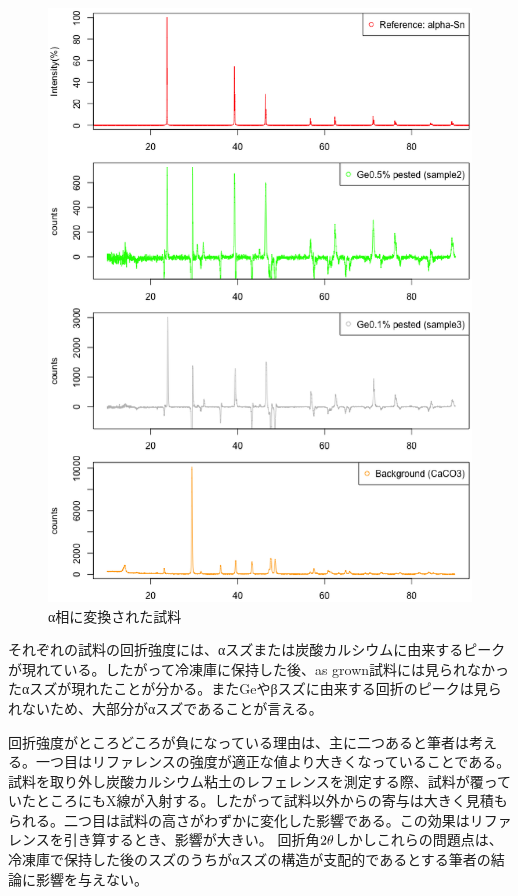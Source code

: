 \begin{figure}[!h]
  \begin{center}
  \includegraphics[width=0.8\hsize]{results_discussions/intensity_pested_samples.eps}
  \end{center}
  \caption{α相に変換された試料}
  \label{fig:intensity_pested_samples}
\end{figure}

それぞれの試料の回折強度には、αスズまたは炭酸カルシウムに由来するピークが現れている。したがって冷凍庫に保持した後、as grown試料には見られなかったαスズが現れたことが分かる。またGeやβスズに由来する回折のピークは見られないため、大部分がαスズであることが言える。

回折強度がところどころが負になっている理由は、主に二つあると筆者は考える。一つ目はリファレンスの強度が適正な値より大きくなっていることである。試料を取り外し炭酸カルシウム粘土のレフェレンスを測定する際、試料が覆っていたところにもX線が入射する。したがって試料以外からの寄与は大きく見積もられる。二つ目は試料の高さがわずかに変化した影響である。この効果はリファレンスを引き算するとき、影響が大きい。
回折角$\rm 2\theta$しかしこれらの問題点は、冷凍庫で保持した後のスズのうちがαスズの構造が支配的であるとする筆者の結論に影響を与えない。


